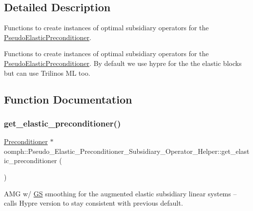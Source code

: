 \subsection{Detailed Description}
Functions to create instances of optimal subsidiary operators for the \hyperlink{classoomph_1_1PseudoElasticPreconditioner}{Pseudo\+Elastic\+Preconditioner}. 

Functions to create instances of optimal subsidiary operators for the \hyperlink{classoomph_1_1PseudoElasticPreconditioner}{Pseudo\+Elastic\+Preconditioner}. By default we use hypre for the the elastic blocks but can use Trilinos ML too. 

\subsection{Function Documentation}
\mbox{\label{namespaceoomph_1_1Pseudo__Elastic__Preconditioner__Subsidiary__Operator__Helper_a89297aa38d1b277fe3db3c0281aa4924}} 
\subsubsection{\texorpdfstring{get\+\_\+elastic\+\_\+preconditioner()}{get\_elastic\_preconditioner()}}
{\footnotesize\ttfamily \hyperlink{classoomph_1_1Preconditioner}{Preconditioner} $\ast$ oomph\+::\+Pseudo\+\_\+\+Elastic\+\_\+\+Preconditioner\+\_\+\+Subsidiary\+\_\+\+Operator\+\_\+\+Helper\+::get\+\_\+elastic\+\_\+preconditioner (\begin{DoxyParamCaption}{ }\end{DoxyParamCaption})}



A\+MG w/ \hyperlink{classoomph_1_1GS}{GS} smoothing for the augmented elastic subsidiary linear systems -- calls Hypre version to stay consistent with previous default. 



